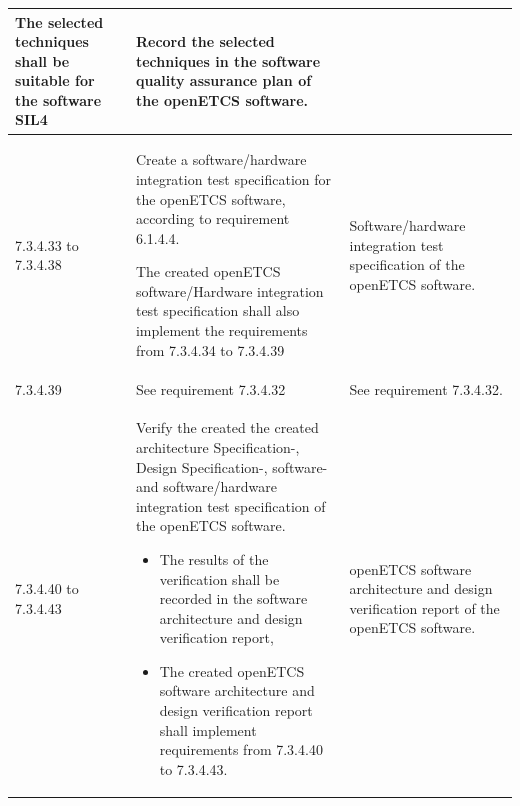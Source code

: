 \documentclass{template/openetcs_report}
\begin{document}
{\begin{longtable}{|p{2cm}|p{9cm}|p{3cm}|}
The selected techniques shall be suitable for the software SIL4
& Record the selected techniques in the software quality assurance plan of the openETCS software.\\ 
\hline
7.3.4.33 to 7.3.4.38 & Create a software/hardware integration test specification for the openETCS software, according to requirement 6.1.4.4.

The created openETCS software/Hardware integration test specification shall also implement the requirements from 7.3.4.34 to 7.3.4.39
& Software/hardware integration test specification of the openETCS software.\\ 
\hline
7.3.4.39 & See requirement 7.3.4.32 & See requirement 7.3.4.32.\\ 
\hline
7.3.4.40 to 7.3.4.43 & Verify the created the created architecture Specification-, Design Specification-,  software- and  software/hardware integration test specification of the openETCS software.
\begin{itemize}\itemsep=0pt
  \item The results of the verification shall be recorded in the software architecture and design verification report,
  \item The created openETCS software architecture and design verification report shall implement requirements from 7.3.4.40 to 7.3.4.43. 
\end{itemize}
& openETCS software architecture and design verification report of the openETCS software.\\ 
\hline
\end{longtable}}
\end{document}
